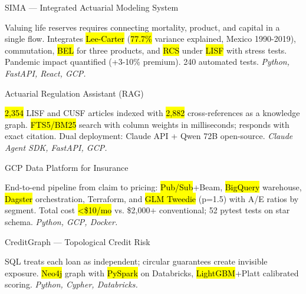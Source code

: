 \documentclass[10pt, letterpaper]{awesome-cv}
\begin{document}
\begin{cventries}

  \cventry
    {SIMA — Integrated Actuarial Modeling System}
    {}
    {}
    {}
    {
      \begin{cvitems}
        \item {Valuing life reserves requires connecting mortality, product, and capital in a single flow. Integrates \hl{Lee-Carter} (\hl{77.7\%} variance explained, Mexico 1990-2019), commutation, \hl{BEL} for three products, and \hl{RCS} under \hl{LISF} with stress tests. Pandemic impact quantified (+3-10\% premium). 240 automated tests. \textit{Python, FastAPI, React, GCP.}}
      \end{cvitems}
    }

  \cventry
    {Actuarial Regulation Assistant (RAG)}
    {}
    {}
    {}
    {
      \begin{cvitems}
        \item {\hl{2,354} LISF and CUSF articles indexed with \hl{2,882} cross-references as a knowledge graph. \hl{FTS5/BM25} search with column weights in milliseconds; responds with exact citation. Dual deployment: Claude API + Qwen 72B open-source. \textit{Claude Agent SDK, FastAPI, GCP.}}
      \end{cvitems}
    }

  \cventry
    {GCP Data Platform for Insurance}
    {}
    {}
    {}
    {
      \begin{cvitems}
        \item {End-to-end pipeline from claim to pricing: \hl{Pub/Sub}+Beam, \hl{BigQuery} warehouse, \hl{Dagster} orchestration, Terraform, and \hl{GLM Tweedie} (p=1.5) with A/E ratios by segment. Total cost \hl{<\$10/mo} vs. \$2,000+ conventional; 52 pytest tests on star schema. \textit{Python, GCP, Docker.}}
      \end{cvitems}
    }

  \cventry
    {CreditGraph — Topological Credit Risk}
    {}
    {}
    {}
    {
      \begin{cvitems}
        \item {SQL treats each loan as independent; circular guarantees create invisible exposure. \hl{Neo4j} graph with \hl{PySpark} on Databricks, \hl{LightGBM}+Platt calibrated scoring. \textit{Python, Cypher, Databricks.}}
      \end{cvitems}
    }

\end{cventries}
\end{document}
